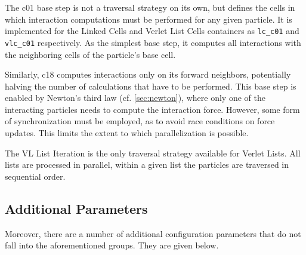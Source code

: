 \begin{description}[leftmargin=!,labelwidth=\widthof{\textbf{VL List Iteration}}]
	\item[\textbf{C01 Base Step}] The c01 base step is not a traversal strategy on its own, but defines the cells in which interaction computations must be performed for any given particle. It is implemented for the Linked Cells and Verlet List Cells containers as \texttt{lc\_c01} and \texttt{vlc\_c01} respectively. As the simplest base step, it computes all interactions with the neighboring cells of the particle’s base cell.
	\item[\textbf{C18 Base Step}] Similarly, c18 computes interactions only on its forward neighbors, potentially halving the number of calculations that have to be performed. This base step is enabled by Newton's third law (cf. \autoref{sec:newton}), where only one of the interacting particles needs to compute the interaction force. However, some form of synchronization must be employed, as to avoid race conditions on force updates. This limits the extent to which parallelization is possible.
	\item[\textbf{VL List Iteration}] The VL List Iteration is the only traversal strategy available for Verlet Lists. All lists are processed in parallel, within a given list the particles are traversed in sequential order.
\end{description}

\subsection{Additional Parameters}
Moreover, there are a number of additional configuration parameters that do not fall into the aforementioned groups. They are given below.

